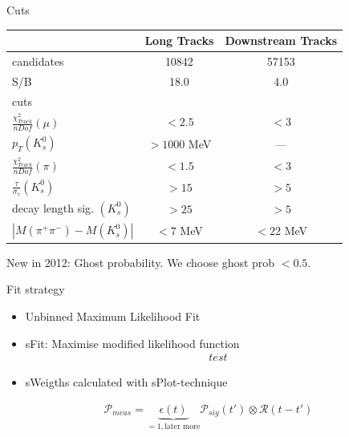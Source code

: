 \documentclass{beamer}
\begin{document}
	
	\begin{frame}{Cuts}
	\begin{center}
	\begin{tabular}{l|c|c}
	& Long Tracks & Downstream Tracks \\ \hline \hline
	candidates & 10842 & 57153 \\ \hline
	S/B & 18.0 & 4.0\\ \hline 
	cuts & & \\
	$\frac{\chi^2_{Track}}{nDof}(\mu)$ & $< 2.5$ & $< 3$ \\
	$p_T(K_s^0)$ & $> 1000$ MeV & --- \\
	$\frac{\chi^2_{Track}}{nDof}(\pi)$ & $< 1.5$ & $< 3$ \\
	$\frac{\tau}{\sigma_{\tau}}(K_s^0)$ & $> 15$ & $> 5$ \\
	decay length sig. $(K_s^0)$ & $> 25$ & $> 5$ \\
	$|M(\pi^+\pi^-)-M(K_s^0)|$ & $< 7$ MeV & $< 22$ MeV \\
	\end{tabular}	
	\end{center}
	New in 2012: Ghost probability. We choose ghost prob $<0.5$.
	\end{frame}
	
	\begin{frame}{Fit strategy}
	\begin{itemize}
	\item Unbinned Maximum Likelihood Fit
	\item sFit: Maximise modified likelihood function
	\begin{align}
	test
	\end{align}
	\item sWeigths calculated with sPlot-technique
	\end{itemize}
	\begin{align}
	\mathcal{P}_{meas} = \underbrace{\epsilon(t)}_{= 1, \text{later more}}\mathcal{P}_{sig}(t') \otimes \mathcal{R}(t-t')
	\end{align}
	\end{frame}
	
\end{document}
